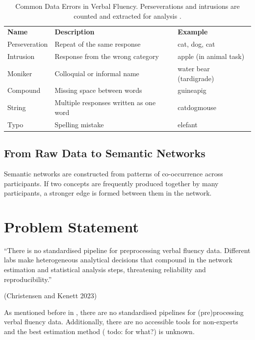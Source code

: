 \begin{table}[H]
    \centering
    \begin{tabular}{lll}
        \textbf{Name} & \textbf{Description} & \textbf{Example} \\
        Perseveration & Repeat of the same response & cat, dog, cat \\
        Intrusion & Response from the wrong category & apple (in animal task) \\
        Moniker & Colloquial or informal name & water bear (tardigrade) \\
        Compound & Missing space between words & guineapig \\
        String & Multiple responses written as one word & catdogmouse \\
        Typo & Spelling mistake & elefant
    \end{tabular}
    \caption{Common Data Errors in Verbal Fluency. Perseverations and intrusions are counted and extracted for analysis \cite{ChristensenKenett2023}.}\label{tab:data-errors-verbal-fluency}
\end{table}

\subsection*{From Raw Data to Semantic Networks}
Semantic networks are constructed from patterns of co-occurrence across participants.
If two concepts are frequently produced together by many participants, a stronger edge is formed between them in the network.
\begin{figure}[H]
\end{figure}

\section{Problem Statement}\label{sec:problem-statement}
\begin{center}
    ``There is no standardised pipeline for preprocessing verbal fluency data. Different labs
    make heterogeneous analytical decisions that compound in the network estimation
    and statistical analysis steps, threatening reliability and reproducibility.''
\end{center}
(Christensen and Kenett 2023)

\noindent As mentioned before in , there are no standardised pipelines for (pre)processing
verbal fluency data.
Additionally, there are no accessible tools for non-experts and the best estimation method (
todo: for what?) is unknown.
